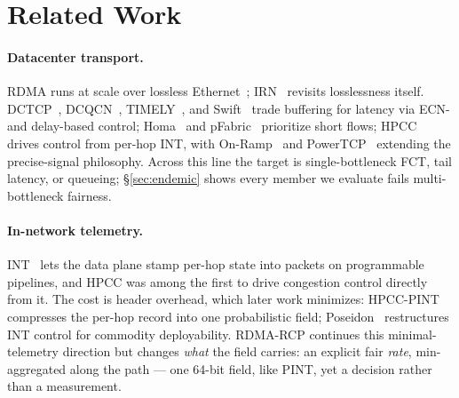 \documentclass[sigconf, nonacm]{acmart}
\newcommand{\hpccfs}{\textsc{RDMA-RCP}\xspace}
\begin{document}
\section{Related Work}
\label{sec:related}

\paragraph{Datacenter transport.} RDMA runs at scale over lossless
Ethernet~\cite{guo2016rdma}; IRN~\cite{mittal2018irn} revisits losslessness itself.
DCTCP~\cite{alizadeh2010dctcp}, DCQCN~\cite{zhu2015dcqcn},
TIMELY~\cite{mittal2015timely}, and Swift~\cite{kumar2020swift} trade buffering for latency
via ECN- and delay-based control; Homa~\cite{montazeri2018homa} and pFabric~\cite{alizadeh2013pfabric}
prioritize short flows; HPCC~\cite{li2019hpcc} drives control from per-hop INT, with
On-Ramp~\cite{liu2021onramp} and PowerTCP~\cite{addanki2022powertcp} extending the precise-signal
philosophy. Across this line the target is single-bottleneck FCT, tail latency, or queueing;
\S\ref{sec:endemic} shows every member we evaluate fails multi-bottleneck fairness.

\paragraph{In-network telemetry.} INT~\cite{kim2015int} lets the data plane stamp per-hop state into
packets on programmable pipelines, and HPCC was among the first to drive congestion control directly
from it. The cost is header overhead, which later work minimizes: HPCC-PINT~\cite{yang2020pint}
compresses the per-hop record into one probabilistic field; Poseidon~\cite{wang2023poseidon}
restructures INT control for commodity deployability. \hpccfs continues this
minimal-telemetry direction but changes \emph{what} the field carries: an explicit fair
\emph{rate}, min-aggregated along the path --- one 64-bit field, like PINT, yet a decision
rather than a measurement.
\end{document}
